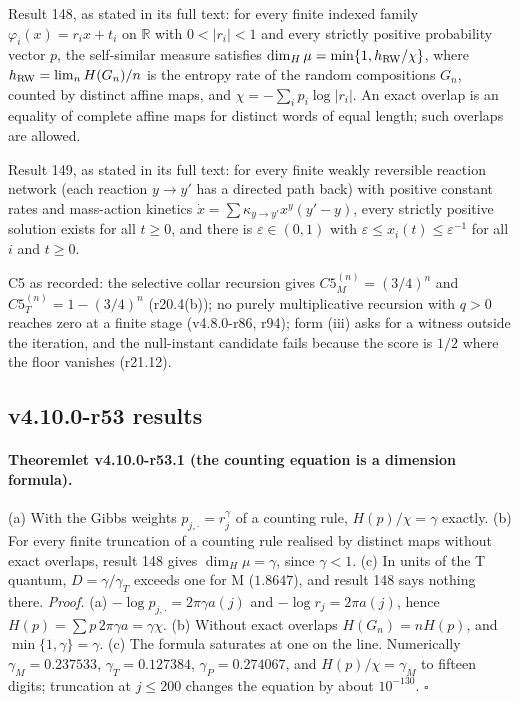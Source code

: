 Result 148, as stated in its full text: for every finite indexed family \(\varphi_i(x)=r_ix+t_i\) on \(\mathbb R\) with \(0<|r_i|<1\) and every strictly
positive probability vector \(p\), the self-similar measure satisfies \(\dim_H\mu=\min\{1,h_{\rm RW}/\chi\}\), where \(h_{\rm RW}=\lim_n H(G_n)/n\) is the entropy
rate of the random compositions \(G_n\), counted by distinct affine maps, and \(\chi=-\sum_ip_i\log|r_i|\).  An exact overlap is an equality of complete
affine maps for distinct words of equal length; such overlaps are allowed.

Result 149, as stated in its full text: for every finite weakly reversible reaction network (each reaction \(y\to y'\) has a directed path back) with
positive constant rates and mass-action kinetics \(\dot x=\sum\kappa_{y\to y'}x^y(y'-y)\), every strictly positive solution exists for all \(t\ge0\), and there
is \(\varepsilon\in(0,1)\) with \(\varepsilon\le x_i(t)\le\varepsilon^{-1}\) for all \(i\) and \(t\ge0\).

C5 as recorded: the selective collar recursion gives \(C5_M^{(n)}=(3/4)^n\) and \(C5_T^{(n)}=1-(3/4)^n\) (r20.4(b)); no purely multiplicative recursion
with \(q>0\) reaches zero at a finite stage (v4.8.0-r86, r94); form (iii) asks for a witness outside the iteration, and the null-instant candidate
fails because the score is \(1/2\) where the floor vanishes (r21.12).

\subsection*{v4.10.0-r53 results}
\label{subsec:v4100-r53-results}

\paragraph{Theoremlet v4.10.0-r53.1 (the counting equation is a dimension formula).}
(a) With the Gibbs weights \(p_{j,\cdot}=r_j^{\gamma}\) of a counting rule, \(H(p)/\chi=\gamma\) exactly.  (b) For every finite truncation of a counting
rule realised by distinct maps without exact overlaps, result 148 gives \(\dim_H\mu=\gamma\), since \(\gamma<1\).  (c) In units of the T quantum,
\(D=\gamma/\gamma_T\) exceeds one for M (\(1.8647\)), and result 148 says nothing there.
\emph{Proof.} (a) \(-\log p_{j,\cdot}=2\pi\gamma a(j)\) and \(-\log r_j=2\pi a(j)\), hence \(H(p)=\sum p\,2\pi\gamma a=\gamma\chi\).  (b) Without exact overlaps
\(H(G_n)=nH(p)\), and \(\min\{1,\gamma\}=\gamma\).  (c) The formula saturates at one on the line.  Numerically \(\gamma_M=0.237533\), \(\gamma_T=0.127384\),
\(\gamma_P=0.274067\), and \(H(p)/\chi=\gamma_M\) to fifteen digits; truncation at \(j\le200\) changes the equation by about \(10^{-130}\).  \(\square\)

